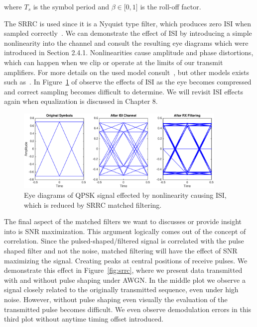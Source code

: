 \documentclass[letterpaper,12pt]{article}
\begin{document}
%
where $T_s$ is the symbol period and $\beta \in \big[0,1\big]$ is the roll-off factor.\par
%
The SRRC is used since it is a Nyquist type filter, which produces zero ISI when sampled correctly~\cite{proakis2008}. We can demonstrate the effect of ISI by introducing a simple nonlinearity into the channel and consult the resulting eye diagrams which were introduced in Section 2.4.1.  Nonlinearities cause amplitude and phase distortions, which can happen when we clip or operate at the limits of our transmit amplifiers.  For more details on the used model consult~\cite{saleh1981}, but other models exists such as~\cite{boum2006}.  In Figure~\ref{fig:isi} of observe the effects of ISI as the eye becomes compressed and correct sampling becomes difficult to determine.  We will revisit ISI effects again when equalization is discussed in Chapter 8.\par
%
\begin{figure}[!ht]
 \centering
 \includegraphics[width=0.9\textwidth]{isiExample.eps}
\caption{Eye diagrams of QPSK signal effected by nonlinearity causing ISI, which is reduced by SRRC matched filtering.}
\label{fig:isi}
\end{figure} 
%
The final aspect of the matched filters we want to discusses or provide insight into is SNR maximization.  This argument logically comes out of the concept of correlation.  Since the pulsed-shaped/filtered signal is correlated with the pulse shaped filter and not the noise, matched filtering will have the effect of SNR maximizing the signal.  Creating peaks at central positions of receive pulses.  We demonstrate this effect in Figure~\ref{fig:srrc}, where we present data transmitted with and without pulse shaping under AWGN.  In the middle plot we observe a signal closely related to the originally transmitted sequence, even under high noise.  However, without pulse shaping even visually the evaluation of the transmitted pulse becomes difficult.  We even observe demodulation errors in this third plot without anytime timing offset introduced.\par
\end{document}
